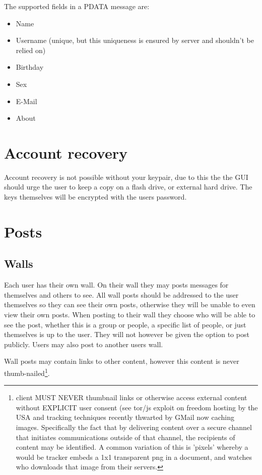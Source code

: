 The supported fields in a PDATA message are:
    \begin{itemize}
        \item Name
        \item Username (unique, but this uniqueness is ensured by server and
              shouldn't be relied on)
        \item Birthday
        \item Sex
        \item E-Mail
        \item About
    \end{itemize}

\section{Account recovery}
Account recovery is not possible without your keypair, due to this the the GUI
should urge the user to keep a copy on a flash drive, or external hard drive.
The keys themselves will be encrypted with the users password.

\section{Posts}
\subsection{Walls}
Each user has their own wall. On their wall they may posts messages for
themselves and others to see. All wall posts should be addressed to the user
themselves so they can see their own posts, otherwise they will be unable to even
view their own posts. When posting to their wall they choose who will be able to
see the post, whether this is a group or people, a specific list of people, or
just themselves is up to the user. They will not however be given the option to
post publicly. Users may also post to another users wall.

Wall posts may contain links to other content, however this content is never
thumb-nailed\footnote{client MUST NEVER thumbnail links or otherwise access
external content without EXPLICIT user consent (see tor/js exploit on freedom
hosting by the USA and tracking techniques recently thwarted by GMail now
caching images. Specifically the fact that by delivering content over a secure
channel that initiates communications outside of that channel, the recipients of
content may be identified. A common variation of this is 'pixels' whereby a
would be tracker embeds a 1x1 transparent png in a document, and watches who
downloads that image from their servers.\cite{webbug}}.

